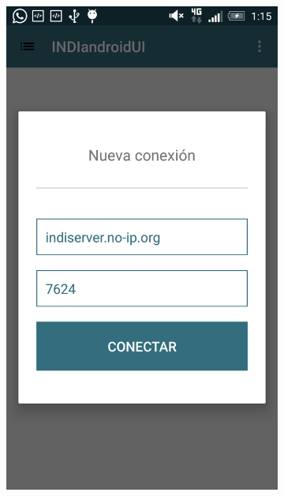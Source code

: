 \begin{figure}
    \centering
    \begin{subfigure}[]{0.45\textwidth}
        \includegraphics[width=\textwidth]{../images/captura.png}
        \caption{}
        \label{fig:captura1}
    \end{subfigure}
    \begin{subfigure}[]{0.45\textwidth}

\end{subfigure}
\end{figure}
